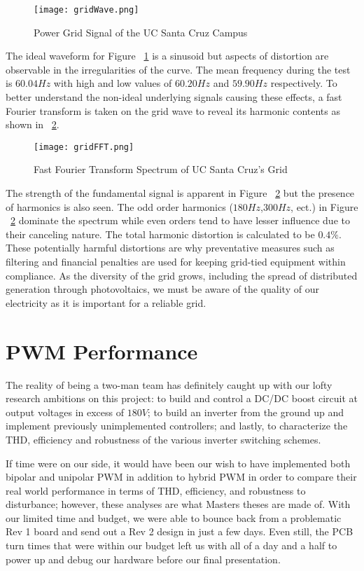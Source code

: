 \begin{figure}
\centering
\texttt{[image: gridWave.png]}
\caption{Power Grid Signal of the UC Santa Cruz Campus}
\label{gridWave}
\end{figure}

The ideal waveform for Figure ~\ref{gridWave} is a sinusoid but aspects of distortion are observable in the irregularities of the curve. The mean frequency during the test is $60.04 Hz$ with high and low values of $60.20 Hz$ and $59.90 Hz$ respectively. To better understand the non-ideal underlying signals causing these effects, a fast Fourier transform is taken on the grid wave to reveal its harmonic contents as shown in ~\ref{gridFFT}.

\begin{figure}
\centering
\texttt{[image: gridFFT.png]}
\caption{Fast Fourier Transform Spectrum of UC Santa Cruz's Grid}
\label{gridFFT}
\end{figure}

The strength of the fundamental signal is apparent in Figure ~\ref{gridFFT} but the presence of harmonics is also seen. The odd order harmonics ($180 Hz$,$300 Hz$, ect.) in  Figure ~\ref{gridFFT} dominate the spectrum while even orders tend to have lesser influence due to their canceling nature. The total harmonic distortion is calculated to be $0.4\%$. These potentially harmful distortions are why preventative measures such as filtering and financial penalties are used for keeping grid-tied equipment within compliance. As the diversity of the grid grows, including the spread of distributed generation through photovoltaics, we must be aware of the quality of our electricity as it is important for a reliable grid.

\section{PWM Performance}
The reality of being a two-man team has definitely caught up with our lofty research ambitions on this project: to build and control a DC/DC boost circuit at output voltages in excess of $180V$; to build an inverter from the ground up and implement previously unimplemented controllers; and lastly, to characterize the THD, efficiency and robustness of the various inverter switching schemes.

If time were on our side, it would have been our wish to have implemented both bipolar and unipolar PWM in addition to hybrid PWM in order to compare their real world performance in terms of THD, efficiency, and robustness to disturbance; however, these analyses are what Masters theses are made of. With our limited time and budget, we were able to bounce back from a problematic Rev 1 board and send out a Rev 2 design in just a few days. Even still, the PCB turn times that were within our budget left us with all of a day and a half to power up and debug our hardware before our final presentation. 


